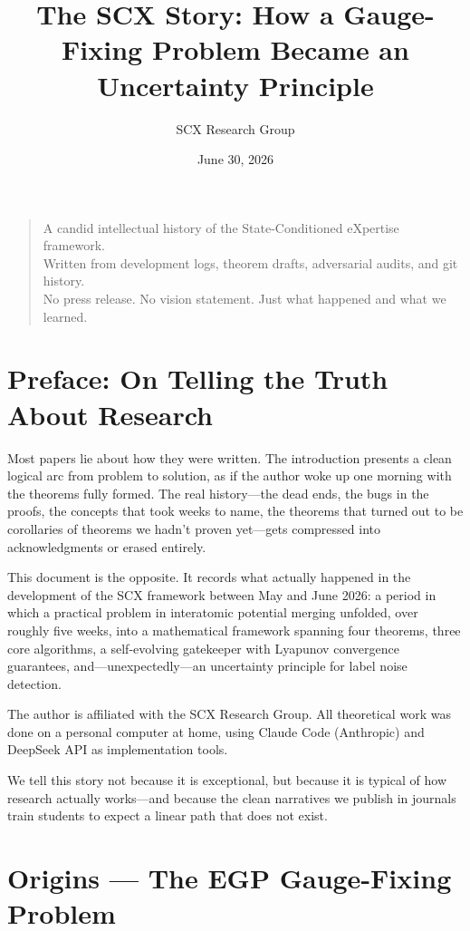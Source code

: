 \documentclass[12pt,a4paper]{ctexart}
\title{The SCX Story: How a Gauge-Fixing Problem Became an Uncertainty Principle}
\author{SCX Research Group}
\date{June 30, 2026}
\begin{document}
\maketitle

\begin{quote}
A candid intellectual history of the State-Conditioned eXpertise framework.\\
Written from development logs, theorem drafts, adversarial audits, and git history.\\
No press release. No vision statement. Just what happened and what we learned.
\end{quote}

\section*{Preface: On Telling the Truth About Research}

Most papers lie about how they were written. The introduction presents a clean logical arc from problem to solution, as if the author woke up one morning with the theorems fully formed. The real history—the dead ends, the bugs in the proofs, the concepts that took weeks to name, the theorems that turned out to be corollaries of theorems we hadn't proven yet—gets compressed into acknowledgments or erased entirely.

This document is the opposite. It records what actually happened in the development of the SCX framework between May and June 2026: a period in which a practical problem in interatomic potential merging unfolded, over roughly five weeks, into a mathematical framework spanning four theorems, three core algorithms, a self-evolving gatekeeper with Lyapunov convergence guarantees, and—unexpectedly—an uncertainty principle for label noise detection.

The author is affiliated with the SCX Research Group. All theoretical work was done on a personal computer at home, using Claude Code (Anthropic) and DeepSeek API as implementation tools.

We tell this story not because it is exceptional, but because it is typical of how research actually works—and because the clean narratives we publish in journals train students to expect a linear path that does not exist.

\section{Origins — The EGP Gauge-Fixing Problem}
\end{document}
